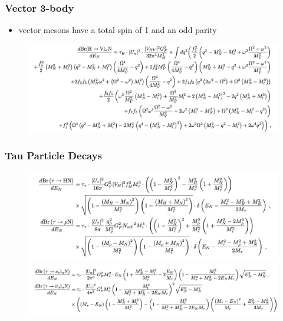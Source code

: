 \documentclass[
	11pt, %
]{beamer}
\begin{document}
\begin{frame}
\frametitle{Vector 3-body}
\begin{itemize}
\item vector mesons have a total spin of 1 and an odd parity
\end{itemize}

\begin{figure}
	\vspace*{1cm}
	 \hspace*{-0cm}
	\includegraphics[scale=.4]{pseudo_vec_3bdy}
	\vspace*{-1cm}
	 \hspace*{-0cm}
	\caption{}
	\centering
\end{figure}
\end{frame}

\begin{frame}
\frametitle{Tau Particle Decays}
\begin{figure}
	\vspace*{1cm}
	 \hspace*{-0cm}
	\includegraphics[scale=.3]{tau_2bdy}
	\includegraphics[scale=.3]{tau_3bdy}
	\vspace*{3cm}
	 \hspace*{-0cm}
	\centering
\end{figure}
\end{frame}
\end{document}
